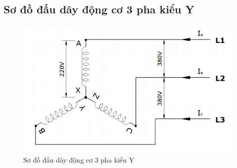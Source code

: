 \documentclass[13pt,a4paper]{extarticle}
\begin{document}
\subsection{Sơ đồ đấu dây động cơ 3 pha kiểu Y}
\begin{figure}[!h]
\begin{center}
\includegraphics[scale=.5]{dau-day-3-pha-Y.png} 
\end{center}
\caption{Sơ đồ đấu dây động cơ 3 pha kiểu Y}\label{Fig:dc-3p}
\end{figure}
\end{document}
